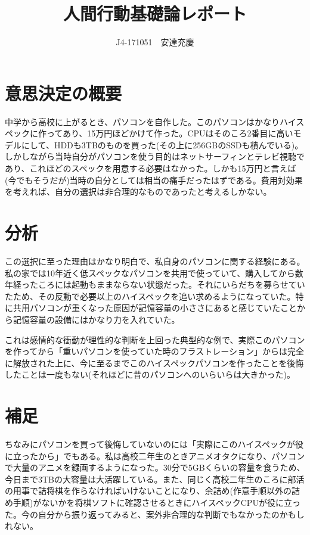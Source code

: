 \documentclass{jsarticle}
\begin{document}
\title{人間行動基礎論レポート}
\author{J4-171051　安達充慶}
\date{}
\maketitle

\section{意思決定の概要}
中学から高校に上がるとき、パソコンを自作した。このパソコンはかなりハイスペックに作ってあり、15万円ほどかけて作った。CPUはそのころ2番目に高いモデルにして、HDDも3TBのものを買った(その上に256GBのSSDも積んでいる)。しかしながら当時自分がパソコンを使う目的はネットサーフィンとテレビ視聴であり、これほどのスペックを用意する必要はなかった。しかも15万円と言えば(今でもそうだが)当時の自分としては相当の痛手だったはずである。費用対効果を考えれば、自分の選択は非合理的なものであったと考えるしかない。
\section{分析}
この選択に至った理由はかなり明白で、私自身のパソコンに関する経験にある。私の家では10年近く低スペックなパソコンを共用で使っていて、購入してから数年経ったころには起動もままならない状態だった。それにいらだちを募らせていたため、その反動で必要以上のハイスペックを追い求めるようになっていた。特に共用パソコンが重くなった原因が記憶容量の小ささにあると感じていたことから記憶容量の設備にはかなり力を入れていた。


これは感情的な衝動が理性的な判断を上回った典型的な例で、実際このパソコンを作ってから「重いパソコンを使っていた時のフラストレーション」からは完全に解放された上に、今に至るまでこのハイスペックパソコンを作ったことを後悔したことは一度もない(それほどに昔のパソコンへのいらいらは大きかった)。
\section{補足}
ちなみにパソコンを買って後悔していないのには「実際にこのハイスペックが役に立ったから」でもある。私は高校二年生のときアニメオタクになり、パソコンで大量のアニメを録画するようになった。30分で5GBくらいの容量を食うため、今日まで3TBの大容量は大活躍している。また、同じく高校二年生のころに部活の用事で詰将棋を作らなければいけないことになり、余詰め(作意手順以外の詰め手順)がないかを将棋ソフトに確認させるときにハイスペックCPUが役に立った。今の自分から振り返ってみると、案外非合理的な判断でもなかったのかもしれない。　
\end{document}
